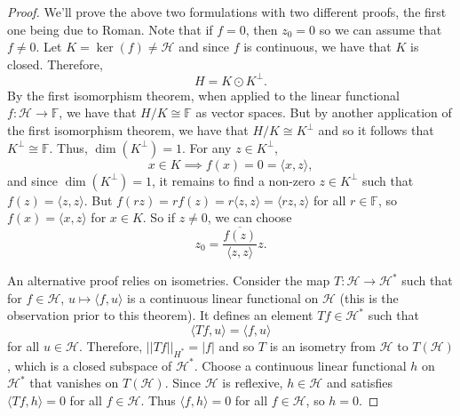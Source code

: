 \documentclass{article}
\theoremstyle{definition}
\theoremstyle{remark}
\numberwithin{equation}{section}
\begin{document}
\begin{proof}
We'll prove the above two formulations with two different proofs, the first one being due to Roman. Note that if $f = 0$, then $z_0 = 0$ so we can assume that $f \neq 0$. Let $K = \ker (f) \neq \mathcal{H}$ and since $f$ is continuous, we have that $K$ is closed. Therefore, 
$$H = K \odot K^{\perp}. $$
By the first isomorphism theorem, when applied to the linear functional $f : \mathcal{H} \rightarrow \mathbb{F}$, we have that $H/K \cong \mathbb{F}$ as vector spaces. But by another application of the first isomorphism theorem, we have that $H/K \cong K^{\perp}$ and so it follows that $K^{\perp} \cong \mathbb{F}.$ Thus, $\dim (K^{\perp}) = 1.$ For any $z \in K^{\perp}$, 
$$x \in K \implies f(x) = 0 = \langle x, z \rangle, $$
and since $\dim (K^{\perp}) = 1$, it remains to find a non-zero $z \in K^{\perp}$ such that $f(z) = \langle z, z \rangle$. But $f(rz) = rf(z) = r\langle z ,z \rangle = \langle rz , z \rangle$ for all $r \in \mathbb{F}$, so $f(x) = \langle x, z\rangle$ for $x \in K$. So if $z \neq 0$, we can choose 
$$z_0 = \frac{\overline{f(z)}}{\langle z, z \rangle} z. $$

An alternative proof relies on isometries. Consider the map $T: \mathcal{H} \rightarrow \mathcal{H}^*$ such that for $f \in \mathcal{H}$, $u \mapsto \langle f, u \rangle $ is a continuous linear functional on $\mathcal{H}$ (this is the observation prior to this theorem). It defines an element $Tf \in \mathcal{H}^*$ such that 
$$\langle Tf, u \rangle = \langle f, u \rangle $$
for all $u \in \mathcal{H}.$ Therefore, $||Tf||_{H^*} = |f|$ and so $T$ is an isometry from $\mathcal{H}$ to $T(\mathcal{H})$, which is a closed subspace of $\mathcal{H}^*$. Choose a continuous linear functional $h$ on $\mathcal{H}^*$ that vanishes on $T(\mathcal{H})$. Since $\mathcal{H}$ is reflexive, $h \in \mathcal{H}$ and satisfies $\langle Tf, h \rangle = 0$ for all $f \in \mathcal{H}$. Thus $\langle f, h \rangle = 0$ for all $f \in \mathcal{H}$, so $h = 0$.
\end{proof}
\end{document}
